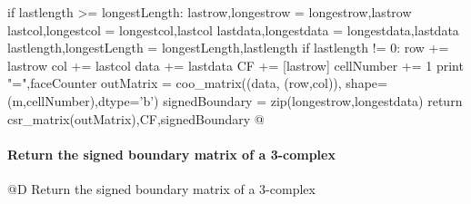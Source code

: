 \documentclass[11pt,oneside]{article}    %
\begin{document}
{        if lastlength >= longestLength:
            lastrow,longestrow = longestrow,lastrow
            lastcol,longestcol = longestcol,lastcol
            lastdata,longestdata = longestdata,lastdata
            lastlength,longestLength = longestLength,lastlength
        if lastlength != 0:
            row += lastrow
            col += lastcol
            data += lastdata
            CF += [lastrow]
            cellNumber += 1 
        print "\nfaceCounter =",faceCounter      
    outMatrix = coo_matrix((data, (row,col)), shape=(m,cellNumber),dtype='b')
    signedBoundary = zip(longestrow,longestdata)
    return csr_matrix(outMatrix),CF,signedBoundary
@}

\paragraph{Return the signed boundary matrix of a 3-complex}
@D Return the signed boundary matrix of a 3-complex
\end{document}
